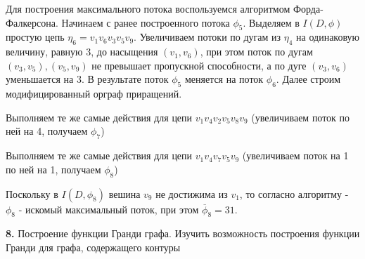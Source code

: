 \documentclass[12pt, letterpaper, titlepage]{article}
\begin{document}
Для построения  максимального потока воспользуемся алгоритмом Форда-Фалкерсона.
Начинаем с ранее построенного потока $\phi_5$. Выделяем в $I(D,\phi)$
простую цепь $\eta_6=v_1v_6v_3v_5v_9$. Увеличиваем потоки по дугам из $\eta_4$
на одинаковую величину, равную 3, до насыщения $(v_1,v_6)$, при этом поток по дугам $(v_3,v_5),(v_5,v_9)$
не превышает пропускной способности, а по дуге $(v_3,v_6)$ уменьшается на 3.
В результате поток $\phi_5$ меняется на поток $\phi_6$. Далее строим модифицированный орграф приращений.
\begin{figure}[H]
    \centering
    \begin{minipage}{0.48\linewidth}
        
    \end{minipage}
    \begin{minipage}{0.48\linewidth}
        
    \end{minipage}
    \caption{}
\end{figure}
Выполняем те же самые действия для цепи $v_1v_4v_2v_5v_8v_9$ (увеличиваем поток по ней на 4, получаем $\phi_7$)
\begin{figure}[H]
    \centering
    \begin{minipage}{0.48\linewidth}
        
    \end{minipage}
    \begin{minipage}{0.48\linewidth}
        
    \end{minipage}
    \caption{}
\end{figure}
Выполняем те же самые действия для цепи $v_1v_4v_7v_5v_9$ (увеличиваем поток на 1 по ней на 1, получаем $\phi_8$)
\begin{figure}[H]
    \centering
    \begin{minipage}{0.48\linewidth}
        
    \end{minipage}
    \begin{minipage}{0.48\linewidth}
        
    \end{minipage}
    \caption{}
\end{figure}
Поскольку в $I(D,\phi_8)$ вешина $v_9$ не достижима из $v_1$, то согласно алгоритму - $\phi_8$ - искомый максимальный поток,
при этом $\overline\phi_8=31$.

\textbf{8.} Построение функции Гранди графа. Изучить возможность построения
функции Гранди для графа, содержащего контуры
\end{document}
